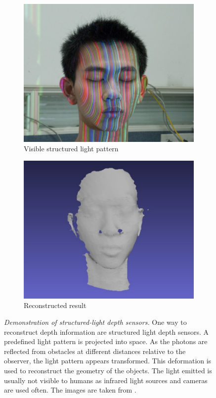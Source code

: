 \begin{figure}[H]
    \centering
    \begin{subfigure}[t]{0.45\textwidth}
        \includegraphics[width=\textwidth]{chapter03/img/depth_pattern_face.png}
        \caption{Visible structured light pattern}
    \end{subfigure}
    \begin{subfigure}[t]{0.45\textwidth}
        \includegraphics[width=\textwidth]{chapter03/img/depth_face_reconstructed.png}
        \caption{Reconstructed result}
    \end{subfigure}
    \caption[Demonstration of structured-light depth sensors]{\emph{Demonstration of structured-light depth sensors.} One way to reconstruct depth information are structured light depth sensors. A predefined light pattern is projected into space. As the photons are reflected from obstacles at different distances relative to the observer, the light pattern appears transformed. This deformation is used to reconstruct the geometry of the objects. The light emitted is usually not visible to humans as infrared light sources and cameras are used often. The images are taken from \cite{sl_depthsensor_calibration}.}\label{fig:sl_face}
\end{figure}

